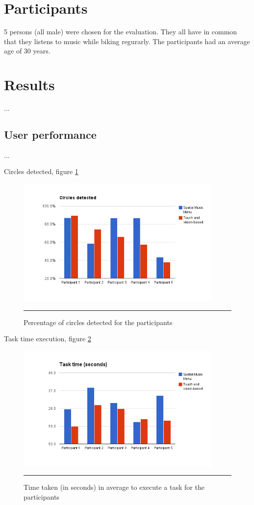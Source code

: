 \section{Participants}
5 persons (all male) were chosen for the evaluation. They all have in common that they listens to music while biking regurarly. The participants had an average age of 30 years.


\section{Results}
...

\subsection{User performance}
...

Circles detected, figure \ref{fig:resultscircles}

\begin{figure}[htbp]
	\centering
		\includegraphics[width=0.9\textwidth,height=\textheight,keepaspectratio]{./Figures/results_circles.png}
		\rule{35em}{1pt}
	\caption[Results circle detections]{Percentage of circles detected for the participants}
	\label{fig:resultscircles}
\end{figure}


Task time execution, figure \ref{fig:resultstasktime}

\begin{figure}[htbp]
	\centering
		\includegraphics[width=0.9\textwidth,height=\textheight,keepaspectratio]{./Figures/results_task_time.png}
		\rule{35em}{1pt}
	\caption[Results task time]{Time taken (in seconds) in average to execute a task for the participants}
	\label{fig:resultstasktime}
\end{figure}


